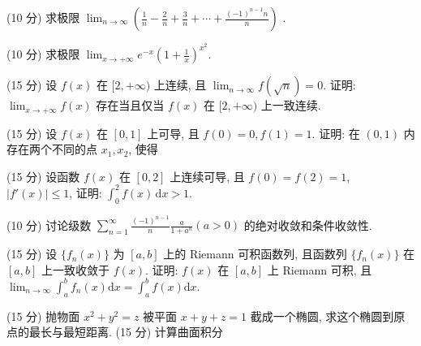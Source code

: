 (10 分) 求极限  $\lim_{n\to\infty}\left(\frac{1}{n}-\frac{2}{n}+\frac{3}{n}+\cdots+\frac{(-1)^{n-1}n}{n}\right)$ .\par
(10 分) 求极限 $\lim_{x \to +\infty} e^{-x} \left(1 + \frac{1}{x}\right)^{x^2}$.\par
(15 分) 设 $f(x)$ 在 $[2, +\infty)$ 上连续, 且 $\lim_{n \to \infty} f(\sqrt{n}) = 0$. 证明: $\lim_{x \to +\infty} f(x)$ 存在当且仅当 $f(x)$ 在 $[2, +\infty)$ 上一致连续.\par
\par{}
(15 分) 设 $f(x)$ 在 $[0,1]$ 上可导, 且 $f(0) = 0, f(1) = 1$. 证明: 在 $(0,1)$ 内存在两个不同的点 $x_1, x_2$, 使得\par
\nopagebreak[4]
(15 分) 设函数 $f(x)$ 在 $[0,2]$ 上连续可导, 且 $f(0) = f(2) = 1$, $|f'(x)| \leq 1$, 证明: $\int_0^2 f(x) \, \mathrm{d}x > 1$.\par
(10 分) 讨论级数 $\sum_{n=1}^{\infty} \frac{(-1)^{n-1}}{n} \frac{a}{1 + a^n} (a > 0)$ 的绝对收敛和条件收敛性.\par
(15 分) 设 $\{f_n(x)\}$ 为 $[a, b]$ 上的 Riemann 可积函数列, 且函数列 $\{f_n(x)\}$ 在 $[a, b]$ 上一致收敛于 $f(x)$. 证明: $f(x)$ 在 $[a, b]$ 上 Riemann 可积, 且 $\lim_{n \to \infty} \int_{a}^{b} f_n(x) \mathrm{d}x = \int_{a}^{b} f(x) \mathrm{d}x$.\par
\par{}
(15 分) 抛物面 $x^{2} + y^{2} = z$ 被平面 $x + y + z = 1$ 截成一个椭圆, 求这个椭圆到原点的最长与最短距离.
(15 分) 计算曲面积分\par
\nopagebreak[4]
